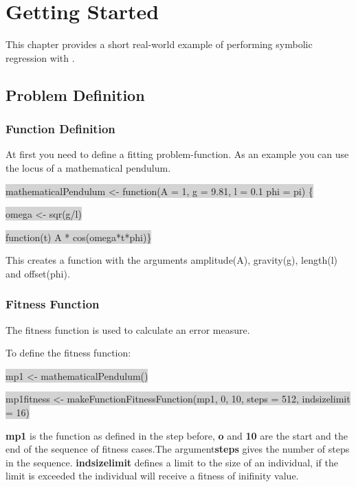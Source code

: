 
\chapter{Getting Started}
This chapter provides a short real-world example of performing symbolic regression with \RGP.

\section{Problem Definition}

\subsection{Function Definition}

At first you need to define a fitting problem-function.
As an example you can use the locus of a mathematical pendulum.

\colorbox{lightgray}{mathematicalPendulum <- function(A = 1, g = 9.81, l = 0.1 phi = pi) \{}

\colorbox{lightgray}{omega <- sqr(g/l)}

\colorbox{lightgray}{function(t) A * cos(omega*t*phi)\}} 

This creates a function with the arguments amplitude(A), gravity(g), length(l) and offset(phi).


\subsection{Fitness Function}
The fitness function is used to calculate an error measure.

To define the fitness function:

\colorbox{lightgray}{mp1 <- mathematicalPendulum()}

\colorbox{lightgray}{mp1fitness <- makeFunctionFitnessFunction(mp1, 0, 10, steps = 512, indsizelimit = 16)}

{\bf mp1} is the function as defined in the step before, {\bf o} and {\bf 10} are the start and the 
end of the sequence of fitness cases.The argument{\bf steps} gives the number of steps in the sequence.
{\bf indsizelimit} defines a limit to the size of an individual,
if the limit is exceeded the individual will receive a fitness of inifinity value. 

\subsection{}








